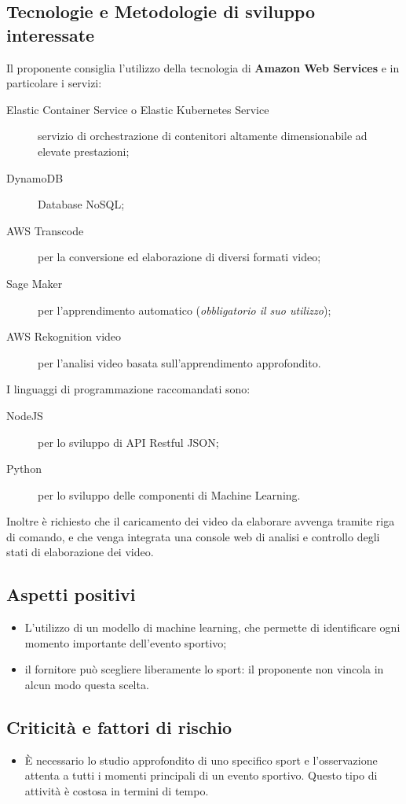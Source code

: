 \documentclass[../studio-di-fattibilita.tex]{subfiles}
\begin{document}
\subsection{Tecnologie e Metodologie di sviluppo interessate}%
\label{subsec:tecnologie_interessate}
Il proponente consiglia l'utilizzo della tecnologia di \textbf{Amazon Web Services} e in particolare i servizi:
\begin{description}
  \item[Elastic Container Service o Elastic Kubernetes Service] servizio di orchestrazione di contenitori altamente dimensionabile ad elevate prestazioni;
  \item[DynamoDB] Database NoSQL;
  \item[AWS Transcode] per la conversione ed elaborazione di diversi formati video;
  \item[Sage Maker] per l'apprendimento automatico (\textit{obbligatorio il suo utilizzo});
  \item[AWS Rekognition video] per l'analisi video basata sull'apprendimento approfondito.
\end{description}
I linguaggi di programmazione raccomandati sono:
\begin{description}
  \item[NodeJS] per lo sviluppo di API Restful JSON;
  \item[Python] per lo sviluppo delle componenti di Machine Learning.
\end{description}
Inoltre è richiesto che il caricamento dei video da elaborare avvenga tramite riga di comando, e che venga integrata una console web di analisi e controllo degli stati di elaborazione dei video.


\subsection{Aspetti positivi}%
\label{subsec:aspetti_positivi}
\begin{itemize}
  \item L'utilizzo di un modello di machine learning, che permette di identificare ogni momento importante dell’evento sportivo;
  \item il fornitore può scegliere liberamente lo sport: il proponente non vincola in alcun modo questa scelta.
\end{itemize}


\subsection{Criticità e fattori di rischio}%
\label{sec:criticita_e_fattori_di_rischio}
\begin{itemize}
  \item È necessario lo studio approfondito di uno specifico sport e l'osservazione attenta a tutti i momenti principali di un evento sportivo. Questo tipo di attività è costosa in termini di tempo.
\end{itemize}
\end{document}
